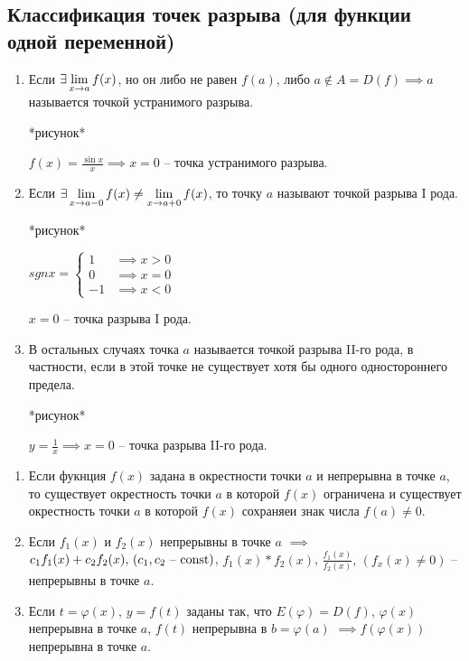 \subsection{Классификация точек разрыва (для функции одной переменной)}

\begin{enumerate}
    \item
        Если $\exists \displaystyle\lim_{x \to a} f(x)$, но он либо не равен $f(a)$, либо
        $a \notin A = D(f) \implies a$ называется точкой устранимого разрыва.

        *рисунок*

        $f(x) = \frac{\sin x}{x} \implies x = 0$ -- точка устранимого разрыва.

    \item 
        Если $\exists \displaystyle\lim_{x \to a - 0} f(x) \ne \displaystyle\lim_{x \to a + 0} f(x)$, то
        точку $a$ называют точкой разрыва I рода.

        *рисунок*

        $sgn x = \begin{cases}
            1  &\implies x > 0 \\
            0  &\implies x = 0 \\
            -1 &\implies x < 0
        \end{cases}$

        $x = 0$ -- точка разрыва I рода.
    
    \item
        В остальных случаях точка $a$ называется точкой разрыва II-го рода, в частности,
        если в этой точке не существует хотя бы одного одностороннего предела.

        *рисунок*

        $y = \frac{1}{x} \implies x = 0$ -- точка разрыва II-го рода.
\end{enumerate}

\begin{theorem}
    \begin{enumerate}
        \item 
            Если фукнция $f(x)$ задана в окрестности точки $a$ и непрерывна в точке $a$,
            то существует окрестность точки $a$ в которой $f(x)$ ограничена и существует
            окрестность точки $a$ в которой $f(x)$ сохраняеи знак числа $f(a) \ne 0$.
        
        \item 
            Если $f_1(x)$ и $f_2(x)$ непрерывны в точке $a$ $\implies$
            $c_1 f_1(x) + c_2 f_2(x), \, (c_1, c_2 \textnormal{ -- const})$,
            $f_1(x) * f_2(x)$, $\frac{f_1(x)}{f_2(x)}, \, (f_x(x) \ne 0)$ -- непрерывны в точке $a$.
        
        \item
            Если $t = \varphi(x), \, y = f(t)$ заданы так, что $E(\varphi) = D(f)$,
            $\varphi(x)$ непрерывна в точке $a$, $f(t)$ непрерывна в $b = \varphi(a)$
            $\implies f(\varphi(x))$ непрерывна в точке $a$.
    \end{enumerate}
\end{theorem}


